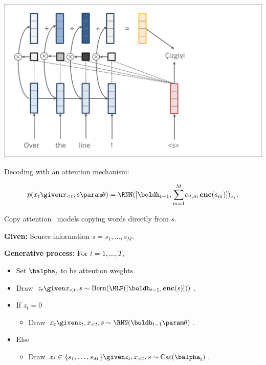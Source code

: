 \begin{frame}
\begin{center}
    \includegraphics[scale=0.24]{pics/attn1step.png}
\end{center}

Decoding with an attention mechanism:

\[p(x_{t} \given x_{< t}, s \param \theta) = \RNN([\boldh_{t-1}, {\sum_{m=1}^M} \alpha_{t,m} \,  \benc(s_m)])_{x_{t}}.\]



\end{frame}

\begin{frame}
Copy attention~\citep{gu2016incorporating,gulcehre2016pointing} models copying words directly from $s$.
\air

\textbf{Given:} Source information $s = s_1, \ldots, s_M$.
\air

\textbf{Generative process:} For $t=1, \ldots, T$,
\begin{itemize}
    \item Set $\balpha_t$ to be attention weights.
    \item Draw $z_{t} \given x_{< t}, s \sim \mathrm{Bern}(\MLP([\boldh_{t-1}, \benc(s)]))$.
    \item If $z_{t} = 0$
    \begin{itemize}
        \item Draw $x_{t} \given z_{t}, x_{< t}, s \sim \RNN(\boldh_{t-1} \param \theta)$.
    \end{itemize}
    \item Else 
    \begin{itemize}
        \item Draw $x_{t} \in \{s_1, \ldots, s_M\} \given z_{t}, x_{< t}, s \sim \mathrm{Cat}(\balpha_t)$.

    \end{itemize}
    \end{itemize}

\end{frame}

